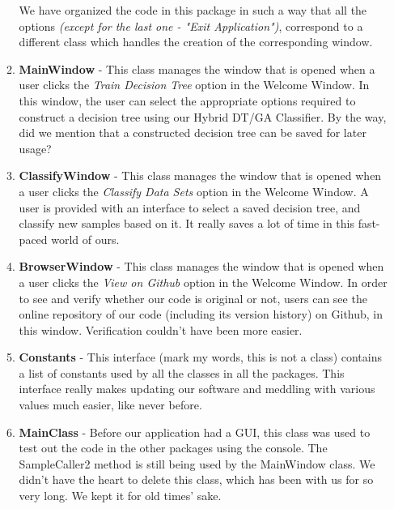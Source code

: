 \documentclass[conference]{IEEEtran}
\begin{document}
\begin{enumerate}
\begin{enumerate}
We have organized the code in this package in such a way that all the options \textit{(except for the last one - "Exit Application")}, correspond to a different class which handles the creation of the corresponding window.

\item{\textbf{MainWindow}} - This class manages the window that is opened when a user clicks the \textit{Train Decision Tree} option in the Welcome Window. In this window, the user can select the appropriate options required to construct a decision tree using our Hybrid DT/GA Classifier. By the way, did we mention that a constructed decision tree can be saved for later usage?

\item{\textbf{ClassifyWindow}} - This class manages the window that is opened when a user clicks the \textit{Classify Data Sets} option in the Welcome Window. A user is provided with an interface to select a saved decision tree, and classify new samples based on it. It really saves a lot of time in this fast-paced world of ours.


\item{\textbf{BrowserWindow}} - This class manages the window that is opened when a user clicks the \textit{View on Github} option in the Welcome Window. In order to see and verify whether our code is original or not, users can see the online repository of our code (including its version history) on Github, in this window. Verification couldn't have been more easier. 

\item{\textbf{Constants}} - This interface (mark my words, this is not a class) contains a list of constants used by all the classes in all the packages. This interface really makes updating our software and meddling with various values much easier, like never before.



\item{\textbf{MainClass}} - Before our application had a GUI, this class was used to test out the code in the other packages using the console. The SampleCaller2 method is still being used by the MainWindow class. We didn't have the heart to delete this class, which has been with us for so very long. We kept it for old times' sake.



\end{enumerate}




\end{enumerate}
\end{document}
